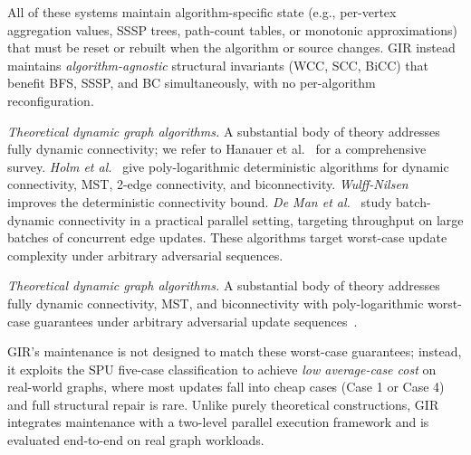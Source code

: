 All of these systems maintain algorithm-specific state (e.g., per-vertex
aggregation values, SSSP trees, path-count tables, or monotonic approximations)
that must be reset or rebuilt when the algorithm or source changes.
GIR instead maintains \emph{algorithm-agnostic} structural invariants
(WCC, SCC, BiCC) that benefit BFS, SSSP, and BC simultaneously, with no
per-algorithm reconfiguration.

\begin{maybecut}
\textit{Theoretical dynamic graph algorithms.}
A substantial body of theory addresses fully dynamic connectivity; we refer
to Hanauer et al.~\cite{Hanauer2022DynSurvey} for a comprehensive survey.
\textit{Holm et al.}~\cite{holm2001poly} give poly-logarithmic deterministic
algorithms for dynamic connectivity, MST, 2-edge connectivity, and
biconnectivity.
\textit{Wulff-Nilsen}~\cite{wulff2013faster} improves the deterministic
connectivity bound.
\textit{De Man et al.}~\cite{de2025towards} study batch-dynamic
connectivity in a practical parallel setting, targeting throughput on
large batches of concurrent edge updates.
These algorithms target worst-case update complexity under arbitrary adversarial
sequences.
\end{maybecut}
\begin{fixed}
\textit{Theoretical dynamic graph algorithms.}
A substantial body of theory addresses fully dynamic connectivity, MST, and
biconnectivity with poly-logarithmic worst-case guarantees under arbitrary
adversarial update
sequences~\cite{Hanauer2022DynSurvey,holm2001poly,wulff2013faster,de2025towards}.
\end{fixed}
GIR's maintenance is not designed to match these worst-case guarantees; instead,
it exploits the SPU five-case classification to achieve \emph{low average-case
cost} on real-world graphs, where most updates fall into cheap cases (Case 1
or Case 4) and full structural repair is rare.
Unlike purely theoretical constructions, GIR integrates maintenance with a
two-level parallel execution framework and is evaluated end-to-end on real
graph workloads.


